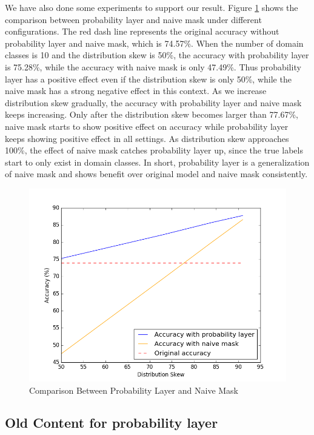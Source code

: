 \documentclass{article}
\begin{document}
We have also done some experiments to support our result. Figure \ref{fig:NaiveMask} shows the comparison between probability layer and naive mask under different configurations. The red dash line represents the original accuracy without probability layer and naive mask, which is 74.57\%. When the number of domain classes is 10 and the distribution skew is 50\%, the accuracy with probability layer is 75.28\%, while the accuracy with naive mask is only 47.49\%. Thus probability layer has a positive effect even if the distribution skew is only 50\%, while the naive mask has a strong negative effect in this context. As we increase distribution skew gradually, the accuracy with probability layer and naive mask keeps increasing. Only after the distribution skew becomes larger than 77.67\%, naive mask starts to show positive effect on accuracy while probability layer keeps showing positive effect in all settings. As distribution skew approaches 100\%, the effect of naive mask catches probability layer up, since the true labels start to only exist in domain classes. In short, probability layer is a generalization of naive mask and shows benefit over original model and naive mask consistently.

\begin{figure}
\includegraphics[scale=0.43]{figure_1-1.png}
\caption{Comparison Between Probability Layer and Naive Mask}
\label{fig:NaiveMask}
\end{figure}







\subsection{Old Content for probability layer}
\end{document}
